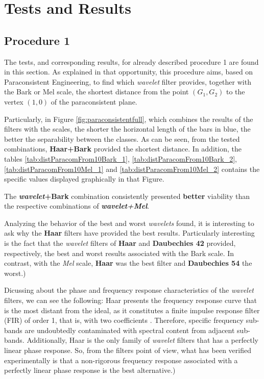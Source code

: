 \section{Tests and Results}
\label{sec:testsResults}
	\subsection{Procedure 1}
		\label{sec:testsResults:subsec:Experimento01}
		\par The tests, and corresponding results, for already described procedure 1   are found in this section. As explained in that opportunity, this procedure aims, based on Paraconsistent Engineering, to find which \textit{wavelet} filter provides, together with the Bark or Mel scale, the shortest distance from the point $(G_1,G_2)$ to the vertex $(1,0)$ of the paraconsistent plane.\\
		
		\par Particularly, in Figure \ref{fig:paraconsistentfull}, which combines the results of the filters with the scales, the shorter the horizontal length of the bars in blue, the better the separability between the classes. As can be seen, from the tested combinations, \textbf{Haar+Bark} provided the shortest distance. In addition, the tables \ref{tab:distParacomFrom10Bark_1}, \ref{tab:distParacomFrom10Bark_2}, \ref{tab:distParacomFrom10Mel_1} and \ref{tab:distParacomFrom10Mel_2} contains the specific values displayed graphically in that Figure.\\
		
		\par The \textbf{\textit{wavelet}+Bark} combination consistently presented \textbf{better} viability than the respective combinations of \textbf{\textit{wavelet+Mel}}.\\
		
		\par Analyzing the behavior of the best and worst \textit{wavelets} found, it is interesting to ask why the \textbf{Haar} filters have provided the best results. Particularly interesting is the fact that the \textit{wavelet} filters of \textbf{Haar} and \textbf{Daubechies 42} provided, respectively, the best and worst results associated with the Bark scale. In contrast, with the \textit{Mel} scale, \textbf{Haar} was the best filter and \textbf{Daubechies 54} the worst.)\\

		\par Dicussing about the phase and frequency response characteristics of the \textit{wavelet} filters, we can see the following: Haar presents the frequency response curve that is the most distant from the ideal, as it constitutes a finite impulse response filter (FIR) of order 1, that is, with two coefficients \cite{WaveletPropertiesBrowser}. Therefore, specific frequency sub-bands are undoubtedly contaminated with spectral content from adjacent sub-bands. Additionally, Haar is the only family of \textit{wavelet} filters that has a perfectly linear phase response. So, from the filters point of view, what has been verified experimentally is that a non-rigorous frequency response associated with a perfectly linear phase response is the best alternative.)

